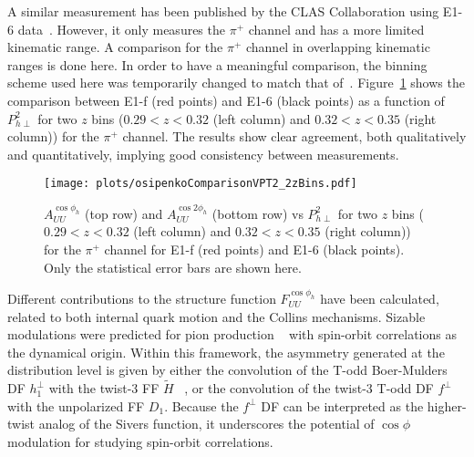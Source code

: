 \documentclass[aps,prl,twocolumn,showpacs,superscriptaddress,groupedaddress]{revtex4}  %
\newcommand{\Phperp}{P_{h\perp}}
\newcommand{\ph}{\phi_h}
\begin{document}
A similar measurement has been published by the CLAS Collaboration using \mbox{E1-6} data~\cite{Osipenko:2008rv}.
However, it only measures the $\pi^+$ channel and has a more limited kinematic range.
A comparison for the $\pi^+$ channel in overlapping kinematic ranges is done here.
In order to have a meaningful comparison, the binning scheme used here was temporarily changed to match that of~\cite{Osipenko:2008rv}.
Figure~\ref{fig:osipenkoComparisonVPT2_2zBins} shows the comparison between E1-f (red points) and E1-6 (black points) as a function of $\Phperp^2$ for two $z$ bins ($0.29 < z < 0.32$ (left column) and $0.32 < z < 0.35$ (right column)) for the $\pi^+$ channel.
The results show clear agreement, both qualitatively and quantitatively, implying good consistency between measurements.
%
\begin{figure}[htp]
\centering
\texttt{[image: plots/osipenkoComparisonVPT2\_2zBins.pdf]}
\caption{$A_{UU}^{\cos \phi_h}$ (top row) and $A_{UU}^{\cos 2\phi_h}$ (bottom row) vs $P_{h\perp}^2$ for two $z$ bins ($0.29 < z < 0.32$ (left column) and $0.32 < z < 0.35$ (right column)) for the $\pi^+$ channel for E1-f (red points) and E1-6 (black points). Only the statistical error bars are shown here.}
\label{fig:osipenkoComparisonVPT2_2zBins}
\end{figure}


Different contributions to the structure function  $F^{\cos \ph}_{UU}$ have been 
calculated, related to both internal quark motion and the Collins mechanisms.
Sizable modulations  were predicted for pion production ~\cite{Anselmino:2005nn} with spin-orbit correlations   as the dynamical origin. Within this framework, the asymmetry generated at the
distribution level is given by either the convolution of the T-odd Boer-Mulders DF
$h_1^{\perp}$ with the twist-3 FF $\tilde{H}$ 
~\cite{Bacchetta:2006tn}, or the convolution of the  twist-3 T-odd DF
$f^\perp$ with the unpolarized FF $D_1$\cite{Metz:2004je}.
 Because the $f^\perp$ DF 
can be interpreted as the higher-twist analog of the Sivers function, 
it underscores the potential of $\cos\phi$ modulation for studying 
spin-orbit correlations. 
\end{document}
